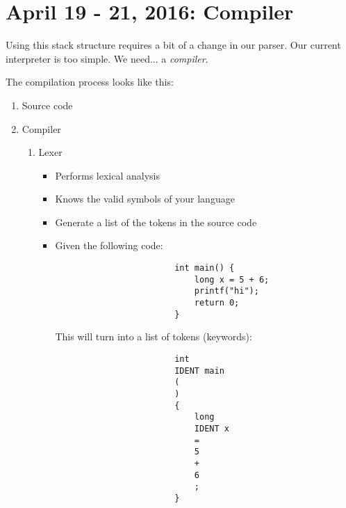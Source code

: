\documentclass[11pt,fleqn]{article}
\theoremstyle{definition}
\begin{document}
\section{April 19 - 21, 2016: Compiler}

Using this stack structure requires a bit of a change in our parser. Our current
interpreter is too simple. We need... a \textit{compiler}.

The compilation process looks like this:

\begin{enumerate}
    \item Source code
    \item Compiler
        \begin{enumerate}
            \item Lexer
                \begin{itemize}
                    \item Performs lexical analysis
                    \item Knows the valid symbols of your language
                    \item Generate a list of the tokens in the source code
                    \item Given the following code: \\
                        \begin{verbatim}
                        int main() {
                            long x = 5 + 6;
                            printf("hi");
                            return 0;
                        }
                        \end{verbatim}
                        This will turn into a list of tokens (keywords):
                        \begin{verbatim}
                        int
                        IDENT main
                        (
                        )
                        {
                            long
                            IDENT x
                            =
                            5
                            +
                            6
                            ;
                        }


\end{verbatim}
\end{itemize}
\end{enumerate}
\end{enumerate}
\end{document}
